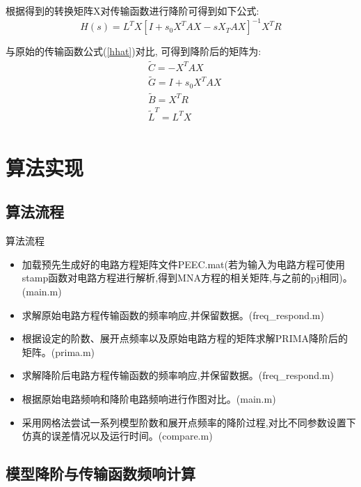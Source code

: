 \documentclass[12pt]{article}
\begin{document}
\begin{sloppypar}
\begin{algorithm}
\begin{algorithmic}[1]
  \end{algorithmic}
\end{algorithm}

\qquad 根据得到的转换矩阵X对传输函数进行降阶可得到如下公式:
\begin{equation}
  H(s)=L^T X\left[I+s_0 X^T A X-s X_T A X\right]^{-1} X^T R
\end{equation}

\qquad 与原始的传输函数公式(\ref{hhat})对比, 可得到降阶后的矩阵为:
\begin{equation}
\label{r}
  \begin{align}
    & \tilde{C}=-X^T A X \\ 
    & \tilde{G}=I+s_0 X^T A X \\
    & \tilde{B}=X^T R \\ 
    & \tilde{L}^T=L^T X \\
  \end{align}
\end{equation}

\newpage
\section{算法实现}
\subsection{算法流程}
\qquad 算法流程
\begin{itemize}
  \item 加载预先生成好的电路方程矩阵文件PEEC.mat(若为输入为电路方程可使用stamp函数对电路方程进行解析,得到MNA方程的相关矩阵,与之前的pj相同)。(main.m)
  \item 求解原始电路方程传输函数的频率响应,并保留数据。(freq\_respond.m)
  \item 根据设定的阶数、展开点频率以及原始电路方程的矩阵求解PRIMA降阶后的矩阵。(prima.m)
  \item 求解降阶后电路方程传输函数的频率响应,并保留数据。(freq\_respond.m)
  \item 根据原始电路频响和降阶电路频响进行作图对比。(main.m)
  \item 采用网格法尝试一系列模型阶数和展开点频率的降阶过程,对比不同参数设置下仿真的误差情况以及运行时间。(compare.m)
\end{itemize}

\subsection{模型降阶与传输函数频响计算}


\end{sloppypar}
\end{document}
